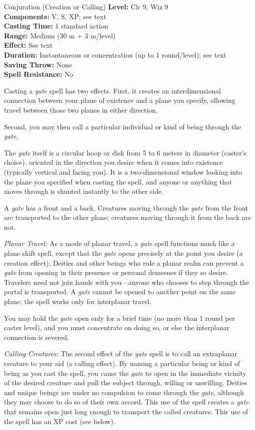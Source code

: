 {Conjuration (Creation or Calling)}
{
	\textbf{Level:}
	Clr 9, Wiz 9\\
	\textbf{Components:}
	V, S, XP; see text\\
	\textbf{Casting Time:}
	1 standard action\\
	\textbf{Range:}
	Medium (30 m + 3 m/level)\\
	\textbf{Effect:}
	See text\\
	\textbf{Duration:}
	Instantaneous or concentration (up to 1 round/level); see text\\
	\textbf{Saving Throw:}
	None\\
	\textbf{Spell Resistance:}
	No\\
}
{
	Casting a \emph{gate} spell has two effects. First, it creates an interdimensional connection between your plane of existence and a plane you specify, allowing travel between those two planes in either direction.

	Second, you may then call a particular individual or kind of being through the \emph{gate}.

	The \emph{gate} itself is a circular hoop or disk from 5 to 6 meters in diameter (caster's choice), oriented in the direction you desire when it comes into existence (typically vertical and facing you). It is a two-dimensional window looking into the plane you specified when casting the spell, and anyone or anything that moves through is shunted instantly to the other side.

	A \emph{gate} has a front and a back. Creatures moving through the \emph{gate} from the front are transported to the other plane; creatures moving through it from the back are not.

	\textit{Planar Travel:}
	As a mode of planar travel, a \emph{gate} spell functions much like a plane shift spell, except that the \emph{gate} opens precisely at the point you desire (a creation effect). Deities and other beings who rule a planar realm can prevent a \emph{gate} from opening in their presence or personal demesnes if they so desire. Travelers need not join hands with you---anyone who chooses to step through the portal is transported. A \emph{gate} cannot be opened to another point on the same plane; the spell works only for interplanar travel.

	You may hold the \emph{gate} open only for a brief time (no more than 1 round per caster level), and you must concentrate on doing so, or else the interplanar connection is severed.

	\textit{Calling Creatures:}
	The second effect of the \emph{gate} spell is to call an extraplanar creature to your aid (a calling effect). By naming a particular being or kind of being as you cast the spell, you cause the \emph{gate} to open in the immediate vicinity of the desired creature and pull the subject through, willing or unwilling. Deities and unique beings are under no compulsion to come through the \emph{gate}, although they may choose to do so of their own accord. This use of the spell creates a \emph{gate} that remains open just long enough to transport the called creatures. This use of the spell has an XP cost (see below).

}
